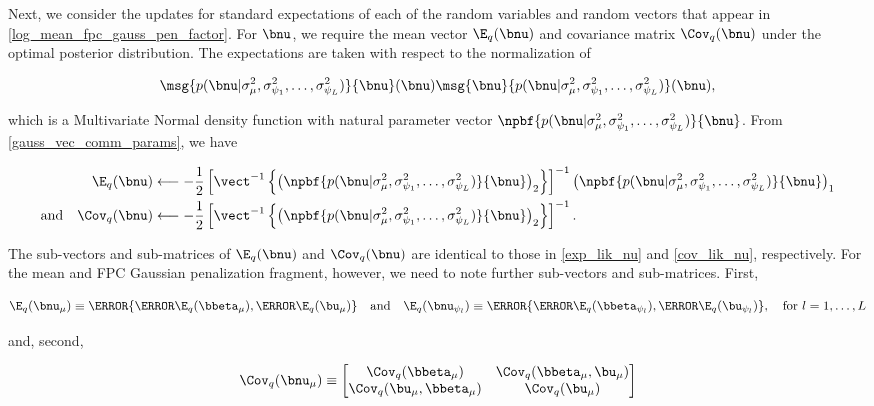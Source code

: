 \documentclass[12pt]{article}
\def\sigsqmu{\sigma^2_{\mu}}
\def\betamu{\bbeta_\mu}
\def\umu{\bu_\mu}
\def\numu{\bnu_\mu}
\newcommand\betapsi[1]{\bbeta_{\psi_{#1}}}
\newcommand\upsi[1]{\bu_{\psi_{#1}}}
\newcommand\nupsi[1]{\bnu_{\psi_{#1}}}
\newcommand\sigsqpsi[1]{\sigma^2_{\psi_{#1}}}
\theoremstyle{plain}
\theoremstyle{definition}
\theoremstyle{remark}
\begin{document}
Next, we consider the updates for standard expectations of each of the random variables and random vectors
that appear in \eqref{log_mean_fpc_gauss_pen_factor}. For $\bnu$, we require the mean vector $\E_q (\bnu)$
and covariance matrix $\Cov_q (\bnu)$ under the optimal posterior distribution. The expectations are taken with
respect to the normalization of

\[
	\msg{p(\bnu | \sigsqmu, \sigsqpsi{1}, \dots, \sigsqpsi{L})}{\bnu} (\bnu)
	\msg{\bnu}{p(\bnu | \sigsqmu, \sigsqpsi{1}, \dots, \sigsqpsi{L})} (\bnu),
\]

\noindent which is a Multivariate Normal density function with natural parameter vector $\npbf{p(\bnu | \sigsqmu,
\sigsqpsi{1}, \dots, \sigsqpsi{L})}{\bnu}$. From \eqref{gauss_vec_comm_params}, we have

\begin{align}
\begin{split}
	\E_q (\bnu)
		&\longleftarrow
			-\frac12 \left[
				\vect^{-1} \left\{
					\left( \npbf{p(\bnu | \sigsqmu, \sigsqpsi{1}, \dots, \sigsqpsi{L})}{\bnu} \right)_2
				\right\}
			\right]^{-1} \left( \npbf{p(\bnu | \sigsqmu, \sigsqpsi{1}, \dots, \sigsqpsi{L})}{\bnu} \right)_1 \\
	\text{and} \quad
	\Cov_q (\bnu)
		&\longleftarrow
			-\frac12 \left[
				\vect^{-1} \left\{
					\left( \npbf{p(\bnu | \sigsqmu, \sigsqpsi{1}, \dots, \sigsqpsi{L})}{\bnu} \right)_2
				\right\}
			\right]^{-1}.
\end{split}
\label{mom_pen_nu}
\end{align}

\noindent The sub-vectors and sub-matrices of $\E_q (\bnu)$ and $\Cov_q (\bnu)$ are identical to those in
\eqref{exp_lik_nu} and \eqref{cov_lik_nu}, respectively. For the mean and FPC Gaussian penalization fragment,
however, we need to note further sub-vectors and sub-matrices. First,

\begin{equation}
	\E_q (\numu) \equiv \T{\left\{ \T{\E_q (\betamu)}, \T{\E_q (\umu)} \right\}} \quad
	\text{and} \quad
	\E_q (\nupsi{l}) \equiv \T{\left\{ \T{\E_q (\betapsi{l})}, \T{\E_q (\upsi{l})} \right\}}, \quad
	\text{for $l = 1, \dots, L$}
\label{exp_betau}
\end{equation}

\noindent and, second,

\begin{equation}
	\Cov_q (\numu) \equiv \begin{bmatrix}
		\Cov_q (\betamu) & \Cov_q (\betamu, \umu) \\
		\Cov_q (\umu, \betamu) & \Cov_q (\umu)
	\end{bmatrix}
\label{cov_betau_mu}
\end{equation}
\end{document}
